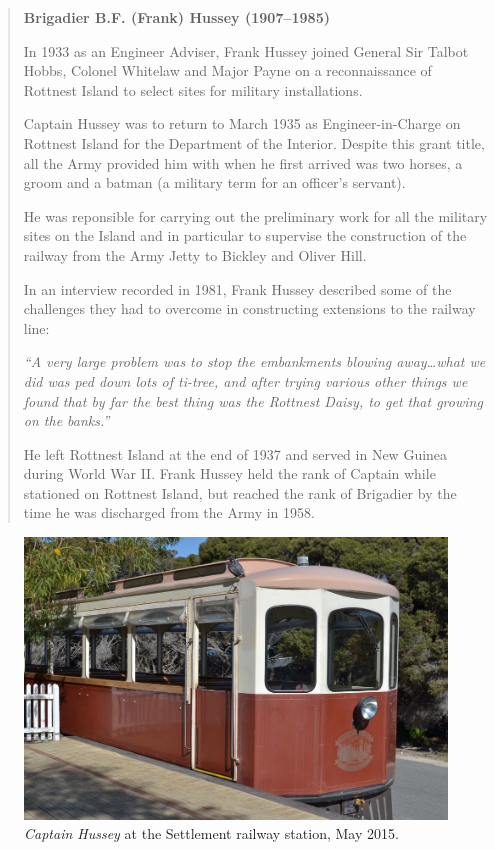 \begin{quotation}
\begin{center}
\textbf{Brigadier B.F. (Frank) Hussey (1907--1985)}
\end{center}

In 1933 as an Engineer Adviser, Frank Hussey joined General Sir Talbot Hobbs, Colonel Whitelaw and Major Payne on a reconnaissance of Rottnest Island to select sites for military installations.

Captain Hussey was to return to March 1935 as Engineer-in-Charge on Rottnest Island for the Department of the Interior. Despite this grant title, all the Army provided him with when he first arrived was two horses, a groom and a batman (a military term for an officer's servant).

He was reponsible for carrying out the preliminary work for all the military sites on the Island and in particular to supervise the construction of the railway from the Army Jetty to Bickley and Oliver Hill.

In an interview recorded in 1981, Frank Hussey described some of the challenges they had to overcome in constructing extensions to the railway line:

\emph{``A very large problem was to stop the embankments blowing away\dots what we did was ped down lots of ti-tree, and after trying various other things we found that by far the best thing was the Rottnest Daisy, to get that growing on the banks.''}

He left Rottnest Island at the end of 1937 and served in New Guinea during World War II. Frank Hussey held the rank of Captain while stationed on Rottnest Island, but reached the rank of Brigadier by the time he was discharged from the Army in 1958.
\end{quotation}

\begin{figure}
 \includegraphics[width=\textwidth]{photos/Captain_Hussey}
 \caption{\emph{Captain Hussey} at the Settlement railway station, May 2015.\cite{CaptainHusseyPhoto}}
 \label{CaptainHussey}
\end{figure}
